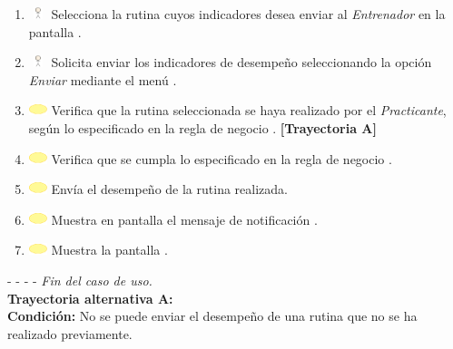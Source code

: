 \begin{enumerate}
	\item \includegraphics[width=15pt, height=10pt]{./Figuras/iconosCU/usuario.png} Selecciona la rutina cuyos indicadores desea enviar al \textit{Entrenador} en la pantalla .
	\item \includegraphics[width=15pt, height=10pt]{./Figuras/iconosCU/usuario.png} Solicita enviar los indicadores de desempeño seleccionando la opción \textit{Enviar} mediante el menú . 
	\item \includegraphics[width=15pt]{./Figuras/iconosCU/herramienta.png} Verifica que la rutina seleccionada se haya realizado por el \textit{Practicante}, según lo especificado en la regla de negocio . \textbf{[Trayectoria A]}
	\item \includegraphics[width=15pt]{./Figuras/iconosCU/herramienta.png} Verifica que se cumpla lo especificado en la regla de negocio .
	\item \includegraphics[width=15pt]{./Figuras/iconosCU/herramienta.png} Envía el desempeño de la rutina realizada.
	\item \includegraphics[width=15pt]{./Figuras/iconosCU/herramienta.png} Muestra en pantalla el mensaje de notificación .
	\item \includegraphics[width=15pt]{./Figuras/iconosCU/herramienta.png} Muestra la pantalla .
\end{enumerate}
	
- - - - \textit{Fin del caso de uso.} \\

\textbf{\large{Trayectoria alternativa A:}}\\
\textbf{Condición: } No se puede enviar el desempeño de una rutina que no se ha realizado previamente.

